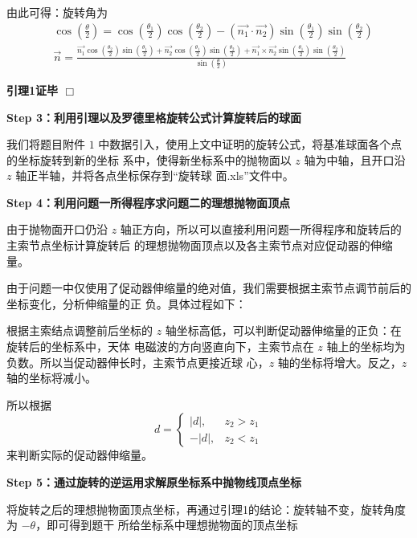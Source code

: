 \documentclass[withoutpreface,bwprint]{cumcmthesis} %
\begin{document}
由此可得：旋转角为
\[
    \begin{split}
        &\cos(\frac{\theta}{2}) = \cos(\frac{\theta _1}{2})
        \cos(\frac{\theta _2}{2}) - (\overrightarrow{n_1} \cdot 
        \overrightarrow{n_2})\sin(\frac{\theta _1}{2})
        \sin(\frac{\theta _2}{2}) \\
        &\overrightarrow{n} = \frac{\displaystyle \overrightarrow{n_1}
        \cos(\frac{\theta _2}{2})\sin(\frac{\theta _1}{2}) + 
        \overrightarrow{n_2}\cos(\frac{\theta _1}{2})
        \sin(\frac{\theta _2}{2}) + \overrightarrow{n_1} \times 
        \overrightarrow{n_2}\sin(\frac{\theta _1}{2})
        \sin(\frac{\theta _2}{2})}
        {\displaystyle \sin(\frac{\theta}{2})} 
    \end{split}
\]\par
\textbf{引理1证毕 $\Box$}

\medskip
\medskip
\medskip
\textbf{Step 3：利用引理以及罗德里格旋转公式计算旋转后的球面}

我们将题目附件 $1$ 中数据引入，使用上文中证明的旋转公式，将基准球面各个点的坐标旋转到新的坐标
系中，使得新坐标系中的抛物面以 $z$ 轴为中轴，且开口沿 $z$ 轴正半轴，并将各点坐标保存到“旋转球
面.xls”文件中。

\textbf{Step 4：利用问题一所得程序求问题二的理想抛物面顶点}

由于抛物面开口仍沿 $z$ 轴正方向，所以可以直接利用问题一所得程序和旋转后的主索节点坐标计算旋转后
的理想抛物面顶点以及各主索节点对应促动器的伸缩量。

由于问题一中仅使用了促动器伸缩量的绝对值，我们需要根据主索节点调节前后的坐标变化，分析伸缩量的正
负。具体过程如下：

根据主索结点调整前后坐标的 $z$ 轴坐标高低，可以判断促动器伸缩量的正负：在旋转后的坐标系中，天体
电磁波的方向竖直向下，主索节点在 $z$ 轴上的坐标均为负数。所以当促动器伸长时，主索节点更接近球
心，$z$ 轴的坐标将增大。反之，$z$ 轴的坐标将减小。

所以根据
\[
    d = 
    \left\{
        \begin{array}{rl}
            |d|,&z_2>z_1 \\
            -|d|,&z_2<z_1
        \end{array}
    \right.
\]
来判断实际的促动器伸缩量。

\textbf{Step 5：通过旋转的逆运用求解原坐标系中抛物线顶点坐标}

将旋转之后的理想抛物面顶点坐标，再通过引理1的结论：旋转轴不变，旋转角度为 $-\theta$，即可得到题干
所给坐标系中理想抛物面的顶点坐标
\end{document}
